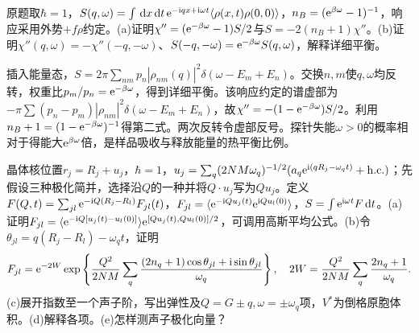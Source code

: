 \begin{exercise}[原题1(a)--(b)]\label{p:512-1-1}
原题取$\hbar=1$，$S(q,\omega)=\int\,\mathrm d x\,\mathrm d t\,\mathrm e^{-\mathrm i qx+\mathrm i\omega t}\langle \rho(x,t)\rho(0,0)\rangle$，$n_B=(\mathrm e^{\beta\omega}-1)^{-1}$，响应采用外势$+f\rho$约定。(a)证明$\chi''=(\mathrm e^{-\beta\omega}-1)S/2$与$S=-2(n_B+1)\chi''$。(b)证明$\chi''(q,\omega)=-\chi''(-q,-\omega)$、$S(-q,-\omega)=\mathrm e^{-\beta\omega}S(q,\omega)$，解释详细平衡。
\end{exercise}
\begin{solution}
插入能量态，$S=2\pi\sum_{nm}p_n|\rho_{nm}(q)|^2\delta(\omega-E_m+E_n)$。交换$n,m$使$q,\omega$均反转，权重比$p_m/p_n=\mathrm e^{-\beta\omega}$，得到详细平衡。该响应约定的谱虚部为$-\pi\sum(p_n-p_m)|\rho_{nm}|^2\delta(\omega-E_m+E_n)$，故$\chi''=-(1-\mathrm e^{-\beta\omega})S/2$。利用$n_B+1=(1-\mathrm e^{-\beta\omega})^{-1}$得第二式。两次反转令虚部反号。探针失能$\omega>0$的概率相对于得能大$\mathrm e^{\beta\omega}$倍，是样品吸收与释放能量的热平衡比例。
\end{solution}
\begin{exercise}[原题2(a)--(e)]\label{p:512-1-2}
晶体核位置$r_j=R_j+u_j$，$\hbar=1$，$u_j=\sum_q(2NM\omega_q)^{-1/2}(a_q\mathrm e^{\mathrm i(qR_j-\omega_qt)}+\mathrm{h.c.})$；先假设三种极化简并，选择沿$Q$的一种并将$Q\cdot u_j$写为$Qu_j$。定义$F(Q,t)=\sum_{jl}\mathrm e^{-\mathrm i Q(R_j-R_l)}F_{jl}(t)$，$F_{jl}=\langle \mathrm e^{-\mathrm i Qu_j(t)}\mathrm e^{\mathrm i Qu_l(0)}\rangle$，$S=\int\mathrm e^{\mathrm i\omega t}F\,\mathrm d t$。(a)证明$F_{jl}=\langle \mathrm e^{-\mathrm i Q[u_j(t)-u_l(0)]}\rangle\mathrm e^{[Qu_j(t),Qu_l(0)]/2}$，可调用高斯平均公式。(b)令$\theta_{jl}=q(R_j-R_l)-\omega_qt$，证明
\begin{equation}
F_{jl}=\mathrm e^{-2W}\exp\left\{\frac{Q^2}{2NM}\sum_q\frac{(2n_q+1)\cos\theta_{jl}+\mathrm i\sin\theta_{jl}}{\omega_q}\right\},\quad2W=\frac{Q^2}{2NM}\sum_q\frac{2n_q+1}{\omega_q}.
\end{equation}
(c)展开指数至一个声子阶，写出弹性及$Q=G\pm q,\omega=\pm\omega_q$项，$V^*$为倒格原胞体积。(d)解释各项。(e)怎样测声子极化向量？
\end{exercise}
